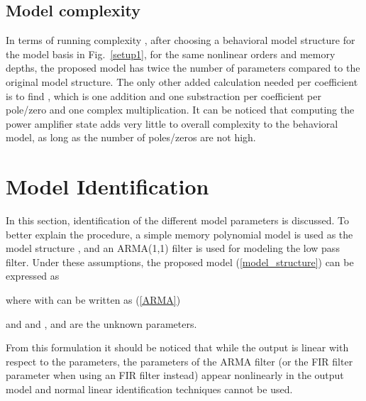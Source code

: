 \documentclass[journal]{IEEEtran}
\begin{document}
\subsection{Model complexity}
In terms of running complexity \cite{soltani}, after choosing a behavioral model structure for the model basis in Fig.~\ref{setup1}, for the same nonlinear orders and memory depths, the proposed model has twice the number of parameters compared to the original model structure. The only other added calculation needed per coefficient is to find , which is one addition and one substraction per coefficient per pole/zero and one complex multiplication. It can be noticed that computing the power amplifier state adds very little to overall complexity to the behavioral model, as long as the number of poles/zeros are not high.

\section{Model Identification}
In this section, identification of the different model parameters is discussed. To better explain the procedure, a simple memory polynomial model \cite{kim} is used as the model structure , and an ARMA(1,1) filter is used for modeling the low pass filter. Under these assumptions, the proposed model (\ref{model_structure}) can be expressed as

where with  can be written as (\ref{ARMA})

and  and ,  and  are the unknown parameters.

From this formulation it should be noticed that while the output is linear with respect to the  parameters, 
the parameters of the ARMA filter  (or the FIR filter parameter  when using an FIR filter instead) 
appear nonlinearly in the output model and normal linear identification techniques cannot be used.
\end{document}
